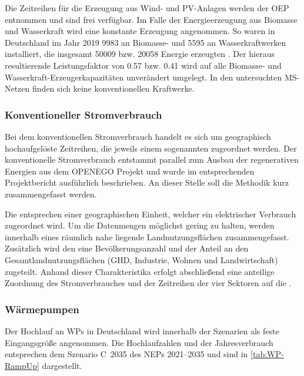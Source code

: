 

Die Zeitreihen für die Erzeugung aus Wind- und \gls{PV}-Anlagen werden der \gls{OEP} \cite{OEP} entnommen und sind frei verfügbar.
Im Falle der Energieerzeugung aus Biomasse und Wasserkraft wird eine konstante Erzeugung angenommen.
So waren in Deutschland im Jahr \num{2019} \SI{9983}{\mw} an Biomasse- und \SI{5595}{\mw} an Wasserkraftwerken installiert, die insgesamt \SI{50009}{\gwh} bzw. \SI{20058}{\gwh} Energie erzeugten \cite{BMWi2020}.
Der hieraus resultierende Leistungsfaktor von \num{0.57} bzw. \num{0.41} wird auf alle Biomasse- und Wasserkraft-Erzeugerkapazitäten unverändert umgelegt.
In den untersuchten \gls{MS}-Netzen finden sich keine konventionellen Kraftwerke.


\subsubsection{Konventioneller Stromverbrauch}

Bei dem konventionellen Stromverbrauch handelt es sich um geographisch hochaufgelöste Zeitreihen, die jeweils einem sogenannten \Lastgebiet zugeordnet werden.
Der konventionelle Stromverbrauch entstammt parallel zum Ausbau der regenerativen Energien aus dem \gls{OPENEGO} Projekt und wurde im entsprechenden Projektbericht \cite{Mueller2019} ausführlich beschrieben.
An dieser Stelle soll die Methodik kurz zusammengefasst werden.\medskip

Die \Lastgebiete entsprechen einer geographischen Einheit, welcher ein elektrischer Verbrauch zugeordnet wird.
Um die Datenmengen möglichst gering zu halten, werden innerhalb eines \Lastgebietes räumlich nahe liegende Landnutzungsflächen zusammengefasst.
Zusätzlich wird den \Lastgebieten eine Bevölkerungsanzahl und der Anteil an den Gesamtlandnutzungsflächen (\gls{GHD}, Industrie, Wohnen und Landwirtschaft) zugeteilt.
Anhand dieser Charakteristika erfolgt abschließend eine anteilige Zuordnung des Stromverbrauches und der Zeitreihen der vier Sektoren auf die \Lastgebietedot.


\subsubsection{Wärmepumpen}

Der Hochlauf an \glspl{WP} in Deutschland wird innerhalb der Szenarien als feste Eingangsgröße angenommen.
Die Hochlaufzahlen und der Jahresverbrauch entsprechen dem Szenario C~\num{2035} des \glspl{NEP} \numrange[range-phrase=~{--}~]{2021}{2035} \cite{BNetzA2020} und sind in \autoref{tab:WP-RampUp} dargestellt.

